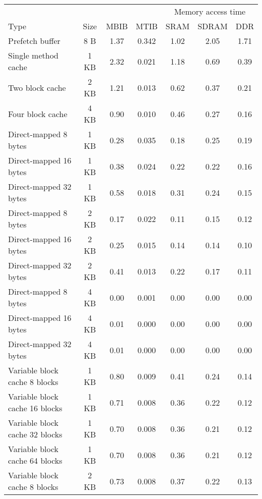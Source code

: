 \begin{table}[htb]
    \centering
{\small
    \begin{tabular}{lcccccc}
    \toprule
    & & & & \multicolumn{3}{c}{Memory access time} \\
    \cmidrule{5-7}
    Type & Size & MBIB & MTIB & SRAM & SDRAM & DDR \\
    \midrule

    Prefetch buffer & 8 B & 1.37 & 0.342                 & 1.02 & 2.05 & 1.71 \\
    Single method cache & 1 KB & 2.32 & 0.021            & 1.18 & 0.69 & 0.39 \\
    Two block cache & 2 KB & 1.21 & 0.013                & 0.62 & 0.37 & 0.21 \\
    Four block cache & 4 KB & 0.90 & 0.010               & 0.46 & 0.27 & 0.16 \\
    Direct-mapped 8 bytes & 1 KB & 0.28 & 0.035          & 0.18 & 0.25 & 0.19 \\
    Direct-mapped 16 bytes & 1 KB & 0.38 & 0.024         & 0.22 & 0.22 & 0.16 \\
    Direct-mapped 32 bytes & 1 KB & 0.58 & 0.018         & 0.31 & 0.24 & 0.15 \\
    Direct-mapped 8 bytes & 2 KB & 0.17 & 0.022          & 0.11 & 0.15 & 0.12 \\
    Direct-mapped 16 bytes & 2 KB & 0.25 & 0.015         & 0.14 & 0.14 & 0.10 \\
    Direct-mapped 32 bytes & 2 KB & 0.41 & 0.013         & 0.22 & 0.17 & 0.11 \\
    Direct-mapped 8 bytes & 4 KB & 0.00 & 0.001          & 0.00 & 0.00 & 0.00 \\
    Direct-mapped 16 bytes & 4 KB & 0.01 & 0.000         & 0.00 & 0.00 & 0.00 \\
    Direct-mapped 32 bytes & 4 KB & 0.01 & 0.000         & 0.00 & 0.00 & 0.00 \\
    Variable block cache 8 blocks & 1 KB & 0.80 & 0.009  & 0.41 & 0.24 & 0.14 \\
    Variable block cache 16 blocks & 1 KB & 0.71 & 0.008 & 0.36 & 0.22 & 0.12 \\
    Variable block cache 32 blocks & 1 KB & 0.70 & 0.008 & 0.36 & 0.21 & 0.12 \\
    Variable block cache 64 blocks & 1 KB & 0.70 & 0.008 & 0.36 & 0.21 & 0.12 \\
    Variable block cache 8 blocks & 2 KB & 0.73 & 0.008  & 0.37 & 0.22 & 0.13 \\

\end{tabular}}
\end{table}
